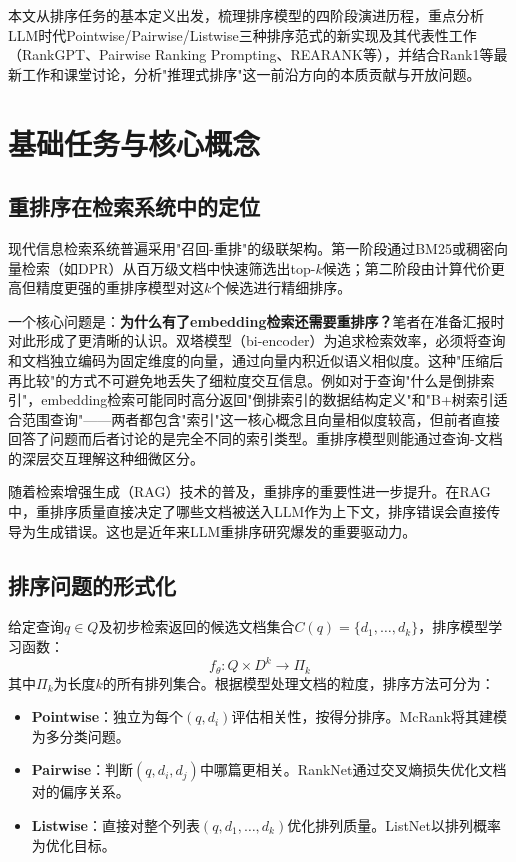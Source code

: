 \documentclass[12pt,a4paper]{article}
\begin{document}
本文从排序任务的基本定义出发，梳理排序模型的四阶段演进历程，重点分析LLM时代Pointwise/Pairwise/Listwise三种排序范式的新实现及其代表性工作（RankGPT\cite{sun2023chatgpt}、Pairwise Ranking Prompting\cite{qin2024large}、REARANK\cite{zhang2025rearank}等），并结合Rank1\cite{weller2025rank1}等最新工作和课堂讨论，分析"推理式排序"这一前沿方向的本质贡献与开放问题。

\section{基础任务与核心概念}

\subsection{重排序在检索系统中的定位}

现代信息检索系统普遍采用"召回-重排"的级联架构\cite{gao2021rethink}。第一阶段通过BM25\cite{robertson2009probabilistic}或稠密向量检索（如DPR\cite{karpukhin2020dense}）从百万级文档中快速筛选出top-$k$候选；第二阶段由计算代价更高但精度更强的重排序模型对这$k$个候选进行精细排序。

一个核心问题是：\textbf{为什么有了embedding检索还需要重排序？}笔者在准备汇报时对此形成了更清晰的认识。双塔模型（bi-encoder）为追求检索效率，必须将查询和文档独立编码为固定维度的向量，通过向量内积近似语义相似度。这种"压缩后再比较"的方式不可避免地丢失了细粒度交互信息。例如对于查询"什么是倒排索引"，embedding检索可能同时高分返回"倒排索引的数据结构定义"和"B+树索引适合范围查询"——两者都包含"索引"这一核心概念且向量相似度较高，但前者直接回答了问题而后者讨论的是完全不同的索引类型。重排序模型则能通过查询-文档的深层交互理解这种细微区分。

随着检索增强生成（RAG）\cite{lewis2020retrieval}技术的普及，重排序的重要性进一步提升。在RAG中，重排序质量直接决定了哪些文档被送入LLM作为上下文，排序错误会直接传导为生成错误。这也是近年来LLM重排序研究爆发的重要驱动力。

\subsection{排序问题的形式化}

给定查询$q \in Q$及初步检索返回的候选文档集合$C(q) = \{d_1, \ldots, d_k\}$，排序模型学习函数：
\begin{equation}
f_\theta: Q \times D^k \to \Pi_k
\end{equation}
其中$\Pi_k$为长度$k$的所有排列集合。根据模型处理文档的粒度，排序方法可分为：
\begin{itemize}[noitemsep]
    \item \textbf{Pointwise}：独立为每个$(q, d_i)$评估相关性，按得分排序。McRank\cite{li2007mcrank}将其建模为多分类问题。
    \item \textbf{Pairwise}：判断$(q, d_i, d_j)$中哪篇更相关。RankNet\cite{burges2005learning}通过交叉熵损失优化文档对的偏序关系。
    \item \textbf{Listwise}：直接对整个列表$(q, d_1, \ldots, d_k)$优化排列质量。ListNet\cite{cao2007learning}以排列概率为优化目标。
\end{itemize}
\end{document}
